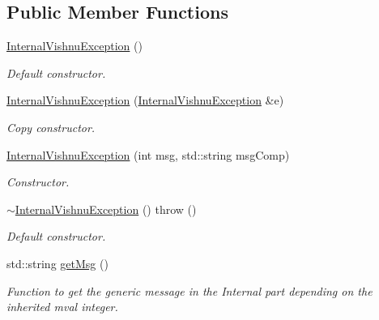 \subsection*{Public Member Functions}
\begin{DoxyCompactItemize}
\item 
\hypertarget{classInternalVishnuException_a3458c28b430f871ece9a3c8771d8f2e8}{
\hyperlink{classInternalVishnuException_a3458c28b430f871ece9a3c8771d8f2e8}{InternalVishnuException} ()}
\label{classInternalVishnuException_a3458c28b430f871ece9a3c8771d8f2e8}

\begin{DoxyCompactList}\small\item\em Default constructor. \item\end{DoxyCompactList}\item 
\hypertarget{classInternalVishnuException_ad3b187c2c6a46b8becc31f9ec762ddba}{
\hyperlink{classInternalVishnuException_ad3b187c2c6a46b8becc31f9ec762ddba}{InternalVishnuException} (\hyperlink{classInternalVishnuException}{InternalVishnuException} \&e)}
\label{classInternalVishnuException_ad3b187c2c6a46b8becc31f9ec762ddba}

\begin{DoxyCompactList}\small\item\em Copy constructor. \item\end{DoxyCompactList}\item 
\hypertarget{classInternalVishnuException_a69f59ea4f36f745d019fcb2a76545245}{
\hyperlink{classInternalVishnuException_a69f59ea4f36f745d019fcb2a76545245}{InternalVishnuException} (int msg, std::string msgComp)}
\label{classInternalVishnuException_a69f59ea4f36f745d019fcb2a76545245}

\begin{DoxyCompactList}\small\item\em Constructor. \item\end{DoxyCompactList}\item 
\hypertarget{classInternalVishnuException_a00fc9c44eb16d1133403894f8adf0850}{
\hyperlink{classInternalVishnuException_a00fc9c44eb16d1133403894f8adf0850}{$\sim$InternalVishnuException} ()  throw ()}
\label{classInternalVishnuException_a00fc9c44eb16d1133403894f8adf0850}

\begin{DoxyCompactList}\small\item\em Default constructor. \item\end{DoxyCompactList}\item 
std::string \hyperlink{classInternalVishnuException_a0240bd64f9acb84e1deb33c994855605}{getMsg} ()
\begin{DoxyCompactList}\small\item\em Function to get the generic message in the Internal part depending on the inherited mval integer. \item\end{DoxyCompactList}\end{DoxyCompactItemize}


